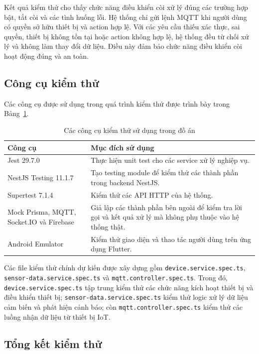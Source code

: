 \documentclass[../DoAn.tex]{subfiles}
\begin{document}
Kết quả kiểm thử cho thấy chức năng điều khiển còi xử lý đúng các trường hợp bật, tắt còi và các tình huống lỗi. Hệ thống chỉ gửi lệnh MQTT khi người dùng có quyền sở hữu thiết bị và action hợp lệ. Với các yêu cầu thiếu xác thực, sai quyền, thiết bị không tồn tại hoặc action không hợp lệ, hệ thống đều từ chối xử lý và không làm thay đổi dữ liệu. Điều này đảm bảo chức năng điều khiển còi hoạt động đúng và an toàn.

\subsection{Công cụ kiểm thử}

Các công cụ được sử dụng trong quá trình kiểm thử được trình bày trong Bảng~\ref{tab:testing-tools}.

\begin{table}[H]
\centering
\renewcommand{\arraystretch}{1.3}
\begin{tabular}{|p{}|p{}|}
\hline
\textbf{Công cụ} & \textbf{Mục đích sử dụng} \\ \hline
Jest 29.7.0 & Thực hiện unit test cho các service xử lý nghiệp vụ. \\ \hline
NestJS Testing 11.1.7 & Tạo testing module để kiểm thử các thành phần trong backend NestJS. \\ \hline
Supertest 7.1.4 & Kiểm thử các API HTTP của hệ thống. \\ \hline
Mock Prisma, MQTT, Socket.IO và Firebase & Giả lập các thành phần bên ngoài để kiểm tra lời gọi và kết quả xử lý mà không phụ thuộc vào hệ thống thật. \\ \hline
Android Emulator & Kiểm thử giao diện và thao tác người dùng trên ứng dụng Flutter. \\ \hline
\end{tabular}
\caption{Các công cụ kiểm thử sử dụng trong đồ án}
\label{tab:testing-tools}
\end{table}

Các file kiểm thử chính dự kiến được xây dựng gồm \texttt{device.service.spec.ts}, \texttt{sensor-data.service.spec.ts} và \texttt{mqtt.controller.spec.ts}. Trong đó, \texttt{device.service.spec.ts} tập trung kiểm thử các chức năng kích hoạt thiết bị và điều khiển thiết bị; \texttt{sensor-data.service.spec.ts} kiểm thử logic xử lý dữ liệu cảm biến và phát hiện cảnh báo; còn \texttt{mqtt.controller.spec.ts} kiểm thử các luồng nhận dữ liệu từ thiết bị IoT.

\subsection{Tổng kết kiểm thử}
\end{document}
